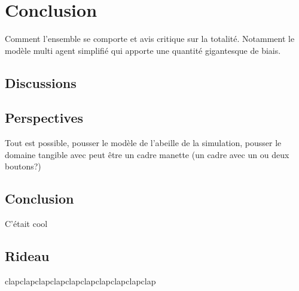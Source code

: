 \chapter*{Conclusion}

	Comment l'ensemble se comporte et avis critique sur la totalité. Notamment le modèle multi agent simplifié qui apporte une quantité gigantesque de biais.
\section*{Discussions}
	
\section*{Perspectives}
	Tout est possible, pousser le modèle de l'abeille de la simulation, pousser le domaine tangible avec peut être un cadre manette (un cadre avec un ou deux boutons?)
\section*{Conclusion}
	C'était cool
\section*{Rideau}
	clapclapclapclapclapclapclapclapclapclap